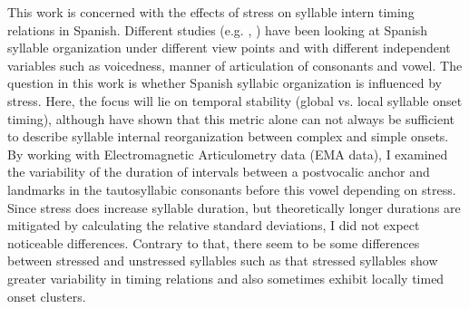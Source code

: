 \documentclass[../Proposal.tex]{subfiles}
\begin{document}
This work is concerned with the effects of stress on syllable intern timing relations in Spanish. 
Different studies (e.g. \cite{gibson2019temporal}, \cite{sotiropoulou2020global}) have been looking at Spanish syllable organization under different view points and with different independent variables such as voicedness, manner of articulation of consonants and vowel. The question in this work is whether Spanish syllabic organization is influenced by stress. Here, the focus will lie on temporal stability (global vs. local syllable onset timing), although \cite{sotiropoulou2020global} have shown that this metric alone can not always be sufficient to describe syllable internal reorganization between complex and simple onsets.\\
By working with Electromagnetic Articulometry data (EMA data), I examined the variability of the duration of intervals between a postvocalic anchor and landmarks in the tautosyllabic consonants before this vowel depending on stress. Since stress does increase syllable duration, but theoretically longer durations are mitigated by calculating the relative standard deviations, I did not expect noticeable differences. Contrary to that, there seem to be some differences between stressed and unstressed syllables such as that stressed syllables show greater variability in timing relations and also sometimes exhibit locally timed onset clusters.
\end{document}
